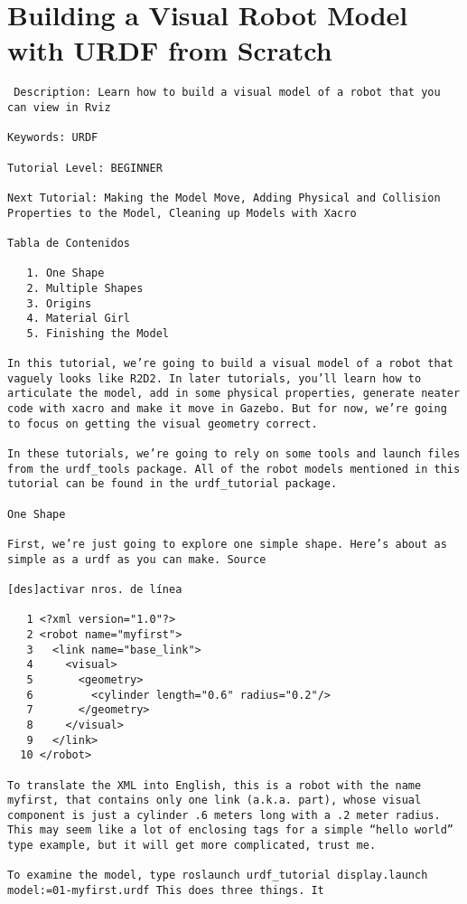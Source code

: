 \chapter*{Building a Visual Robot Model with URDF from Scratch}

\begin{verbatim}
 Description: Learn how to build a visual model of a robot that you can view in Rviz

Keywords: URDF

Tutorial Level: BEGINNER

Next Tutorial: Making the Model Move, Adding Physical and Collision Properties to the Model, Cleaning up Models with Xacro

Tabla de Contenidos

   1. One Shape
   2. Multiple Shapes
   3. Origins
   4. Material Girl
   5. Finishing the Model

In this tutorial, we’re going to build a visual model of a robot that vaguely looks like R2D2. In later tutorials, you’ll learn how to articulate the model, add in some physical properties, generate neater code with xacro and make it move in Gazebo. But for now, we’re going to focus on getting the visual geometry correct.

In these tutorials, we’re going to rely on some tools and launch files from the urdf_tools package. All of the robot models mentioned in this tutorial can be found in the urdf_tutorial package.

One Shape

First, we’re just going to explore one simple shape. Here’s about as simple as a urdf as you can make. Source

[des]activar nros. de línea

   1 <?xml version="1.0"?>
   2 <robot name="myfirst">
   3   <link name="base_link">
   4     <visual>
   5       <geometry>
   6         <cylinder length="0.6" radius="0.2"/>
   7       </geometry>
   8     </visual>
   9   </link>
  10 </robot>

To translate the XML into English, this is a robot with the name myfirst, that contains only one link (a.k.a. part), whose visual component is just a cylinder .6 meters long with a .2 meter radius. This may seem like a lot of enclosing tags for a simple “hello world” type example, but it will get more complicated, trust me.

To examine the model, type roslaunch urdf_tutorial display.launch model:=01-myfirst.urdf This does three things. It


\end{verbatim}
